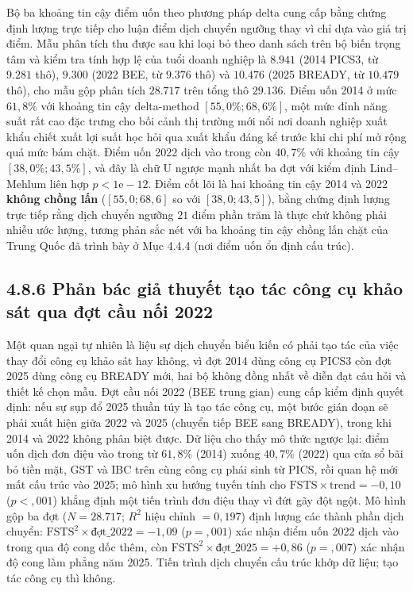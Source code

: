 \documentclass[
  a4paper,
  13pt]{extreport}
\begin{document}
Bộ ba khoảng tin cậy điểm uốn theo phương pháp delta cung cấp bằng chứng
định lượng trực tiếp cho luận điểm dịch chuyển ngưỡng thay vì chỉ dựa
vào giá trị điểm. Mẫu phân tích thu được sau khi loại bỏ theo danh sách
trên bộ biến trọng tâm và kiểm tra tính hợp lệ của tuổi doanh nghiệp là
\(8.941\) (2014 PICS3, từ \(9.281\) thô), \(9.300\) (2022 BEE, từ
\(9.376\) thô) và \(10.476\) (2025 BREADY, từ \(10.479\) thô), cho mẫu
gộp phân tích \(28.717\) trên tổng thô \(29.136\). Điểm uốn 2014 ở mức
\(61{,}8\%\) với khoảng tin cậy delta-method \([55{,}0\%; 68{,}6\%]\),
một mức đỉnh năng suất rất cao đặc trưng cho bối cảnh thị trường mới nổi
nơi doanh nghiệp xuất khẩu chiết xuất lợi suất học hỏi qua xuất khẩu
đáng kể trước khi chi phí mở rộng quá mức bám chặt. Điểm uốn 2022 dịch
vào trong còn \(40{,}7\%\) với khoảng tin cậy \([38{,}0\%; 43{,}5\%]\),
và đây là chữ U ngược mạnh nhất ba đợt với kiểm định Lind--Mehlum liên
hợp \(p < 1\mathrm{e}{-}12\). Điểm cốt lõi là hai khoảng tin cậy 2014 và
2022 \textbf{không chồng lấn} (\([55{,}0; 68{,}6]\) so với
\([38{,}0; 43{,}5]\)), bằng chứng định lượng trực tiếp rằng dịch chuyển
ngưỡng \(21\) điểm phần trăm là thực chứ không phải nhiễu ước lượng,
tương phản sắc nét với ba khoảng tin cậy chồng lấn chặt của Trung Quốc
đã trình bày ở Mục 4.4.4 (nơi điểm uốn ổn định cấu trúc).

\hypertarget{phux1ea3n-buxe1c-giux1ea3-thuyux1ebft-tux1ea1o-tuxe1c-cuxf4ng-cux1ee5-khux1ea3o-suxe1t-qua-ux111ux1ee3t-cux1ea7u-nux1ed1i-2022}{%
\subsection{4.8.6 Phản bác giả thuyết tạo tác công cụ khảo sát qua đợt
cầu nối
2022}\label{phux1ea3n-buxe1c-giux1ea3-thuyux1ebft-tux1ea1o-tuxe1c-cuxf4ng-cux1ee5-khux1ea3o-suxe1t-qua-ux111ux1ee3t-cux1ea7u-nux1ed1i-2022}}

Một quan ngại tự nhiên là liệu sự dịch chuyển biểu kiến có phải tạo tác
của việc thay đổi công cụ khảo sát hay không, vì đợt 2014 dùng công cụ
PICS3 còn đợt 2025 dùng công cụ BREADY mới, hai bộ không đồng nhất về
diễn đạt câu hỏi và thiết kế chọn mẫu. Đợt cầu nối 2022 (BEE trung gian)
cung cấp kiểm định quyết định: nếu sự sụp đổ 2025 thuần túy là tạo tác
công cụ, một bước gián đoạn sẽ phải xuất hiện giữa 2022 và 2025 (chuyển
tiếp BEE sang BREADY), trong khi 2014 và 2022 không phân biệt được. Dữ
liệu cho thấy mô thức ngược lại: điểm uốn dịch đơn điệu vào trong từ
\(61{,}8\%\) (2014) xuống \(40{,}7\%\) (2022) qua cửa sổ bãi bỏ tiền
mặt, GST và IBC trên cùng công cụ phái sinh từ PICS, rồi quan hệ mới mất
cấu trúc vào 2025; mô hình xu hướng tuyến tính cho
\(\mathrm{FSTS} \times \mathrm{trend} = -0{,}10\) (\(p < {,}001\)) khẳng
định một tiến trình đơn điệu thay vì đứt gãy đột ngột. Mô hình gộp ba
đợt (\(N = 28.717\); \(R^2\) hiệu chỉnh \(= 0{,}197\)) định lượng các
thành phần dịch chuyển:
\(\mathrm{FSTS}^2 \times \text{đợt}\_2022 = -1{,}09\) (\(p = {,}001\))
xác nhận điểm uốn 2022 dịch vào trong qua độ cong dốc thêm, còn
\(\mathrm{FSTS}^2 \times \text{đợt}\_2025 = +0{,}86\) (\(p = {,}007\))
xác nhận độ cong làm phẳng năm 2025. Tiến trình dịch chuyển cấu trúc
khớp dữ liệu; tạo tác công cụ thì không.
\end{document}
